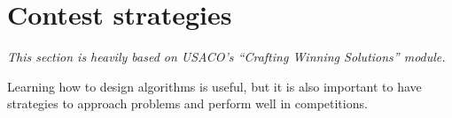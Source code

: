 \section{Contest strategies}

\emph{This section is heavily based on USACO's
``Crafting Winning Solutions'' module.}

Learning how to design algorithms is useful,
but it is also important to have strategies to approach problems
and perform well in competitions.




